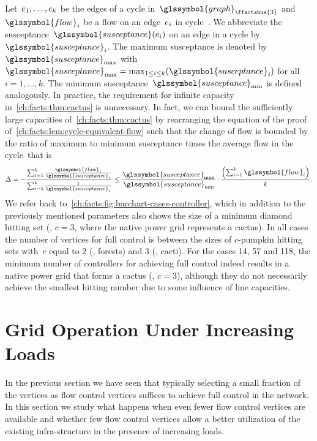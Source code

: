 %
Let~$e_1, \dots, e_k$ be the edges of a cycle
in~$\glssymbol{graph}_{\ffactsbus{3}}$ and~$\glssymbol{flow}_i$ be a flow on an
edge~$e_i$ in cycle~\connectedComponent. We abbreviate the
susceptance~$\glssymbol{susceptance} ( \edge_i )$ on an edge in a cycle
by~$\glssymbol{susceptance}_i$. The maximum susceptance is denoted
by~$\glssymbol{susceptance}_{\max}$ with~$\glssymbol{susceptance}_{\max} =
\max_{1\leq i\leq k}(\glssymbol{susceptance}_i)$ for all~$i = 1, \dots, k$. The
minimum susceptance~$\glssymbol{susceptance}_{\min}$ is defined analogously. In
practice, the requirement for infinite capacity in~\cref{ch:facts:thm:cactus} is
unnecessary. In fact, we can bound the sufficiently large capacities
of~\cref{ch:facts:thm:cactus} by rearranging the equation of the proof
of~\cref{ch:facts:lem:cycle-equivalent-flow} such that the change of flow is
bounded by the ratio of maximum to minimum susceptance times the average flow in
the cycle~\connectedComponent that is
% 
% 
\begin{equation}
% 
\Delta = -\frac{\sum_{i = 1}^{k} \frac{\glssymbol{flow}_i}{\glssymbol{susceptance}_i}}{\sum_{i=1}^{k}
\frac{1}{\glssymbol{susceptance}_i}}\leq\frac{\glssymbol{susceptance}_{\max}}{\glssymbol{susceptance}_{\min}}\cdot
\frac{\left(\sum_{i = 1}^{k} \glssymbol{flow}_i\right)}{k}.
% 
\label{ch:facts:eq:delta-for-cacti}
% 
\end{equation}
% 
We refer back to~\cref{ch:facts:fig:barchart-cases-controller}, which in
addition to the previously mentioned parameters also shows the size of a minimum
diamond hitting set (\ie, $c = 3$, where the native power grid represents a
cactus). In all cases the number of vertices for full control is between the
sizes of $c$-pumpkin hitting sets with~$c$ equal to 2 (\ie, forests) and 3 (\ie,
cacti). For the cases 14, 57 and 118, the minimum number of controllers for
achieving full control indeed results in a native power grid that forms a cactus
(\ie, $c = 3$), although they do not necessarily achieve the smallest hitting
number due to some influence of line capacities.
%
\section{Grid Operation Under Increasing Loads} 
\label{ch:facts:sec:grid-control-when-approaching-capacity-limits}
%
In the previous section we have seen that typically selecting a small fraction
of the vertices as flow control vertices suffices to achieve full control in the
network. In this section we study what happens when even fewer flow control
vertices are available and whether few flow control vertices allow a better
utilization of the existing infra-structure in the presence of increasing loads.

